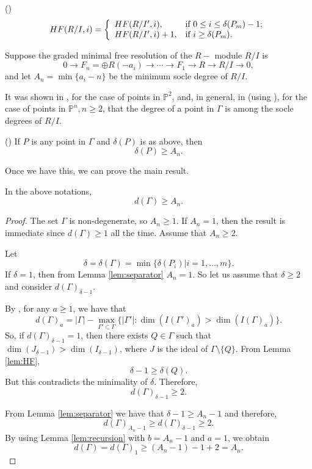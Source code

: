\documentclass[12pt]{amsart}
\begin{document}
\begin{lem} \label{lem:HF}(\cite{gmr})
$$HF(R/I,i)=\left\{
                                        \begin{array}{ll}
                                          HF(R/I',i), & \hbox{if $0\leq i\leq \delta(P_m)-1$;} \\
                                          HF(R/I',i)+1, & \hbox{if $i\geq\delta(P_m)$.}
                                        \end{array}
                                      \right.$$
\end{lem}

Suppose the graded minimal free resolution of the $R-$ module $R/I$ is $$0\rightarrow F_n=\oplus R(-a_i)\rightarrow\cdots\rightarrow F_1\rightarrow R\rightarrow R/I\rightarrow 0,$$ and let $A_n=\min\{a_i-n\}$ be the minimum socle degree of $R/I$.

It was shown in \cite{abm}, for the case of points in $\mathbb P^2$, and, in general, in \cite{b} (using \cite{k}), for the case of points in $\mathbb P^n, n\geq 2$, that the degree of a point in $\Gamma$ is among the socle degrees of $R/I$.

\begin{lem} (\cite{b})\label{lem:separator} If $P$ is any point in $\Gamma$ and $\delta(P)$ is as above, then $$\delta(P)\geq A_n.$$
\end{lem}

Once we have this, we can prove the main result.

\begin{thm} \label{thm:main} In the above notations, $$d(\Gamma)\geq A_n.$$
\end{thm}

\begin{proof} The set $\Gamma$ is non-degenerate, so $A_n\geq 1$. If $A_n=1$, then the result is immediate since $d(\Gamma)\geq 1$ all the time. Assume that $A_n\geq 2$.

Let $$\delta=\delta(\Gamma)=\min\{\delta(P_i)|i=1,\ldots,m\}.$$ If $\delta=1$, then from Lemma \ref{lem:separator} $A_n=1$. So let us assume that $\delta\geq 2$ and consider $d(\Gamma)_{\delta-1}$.

By \cite{h}, for any $a\geq 1$, we have that $$d(\Gamma)_a=|\Gamma|-\max_{\Gamma'\subset\Gamma}\{|\Gamma'|: \dim(I(\Gamma')_a)>\dim(I(\Gamma)_a)\}.$$ So, if $d(\Gamma)_{\delta-1}=1$, then there exists $Q\in\Gamma$ such that $\dim(J_{\delta-1})>\dim(I_{\delta-1})$, where $J$ is the ideal of $\Gamma\setminus\{Q\}$. From Lemma \ref{lem:HF}, $$\delta-1\geq\delta(Q).$$ But this contradicts the minimality of $\delta$. Therefore, $$d(\Gamma)_{\delta-1}\geq 2.$$

From Lemma \ref{lem:separator} we have that $\delta-1\geq A_n-1$ and therefore, $$d(\Gamma)_{A_n-1}\geq d(\Gamma)_{\delta-1}\geq 2.$$ By using Lemma \ref{lem:recursion} with $b=A_n-1$ and $a=1$, we obtain $$d(\Gamma)=d(\Gamma)_1\geq (A_n-1)-1+2=A_n.$$ \end{proof}
\end{document}
